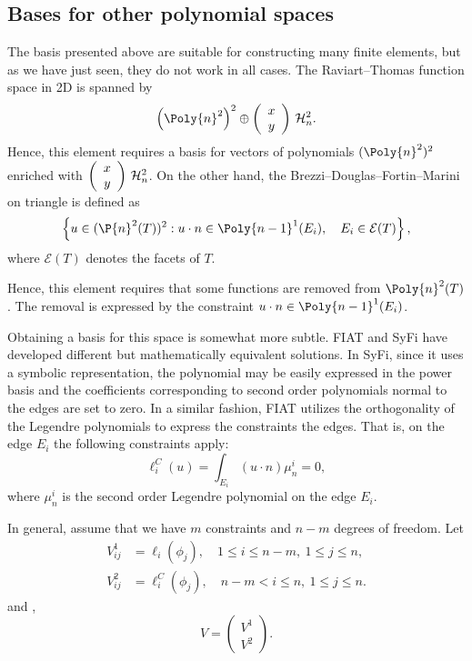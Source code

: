 \subsection{Bases for other polynomial spaces}
The basis presented above are suitable for constructing many finite
elements, but as we have just seen, they do not work in all cases.
The Raviart--Thomas function space in 2D is spanned by
\begin{equation}
\left( \Poly{n}^2 \right)^2 \oplus
\left(\begin{array}{c} x \\y \end{array} \right) \, \H^2_n.
\end{equation}
Hence, this element requires a basis for vectors of polynomials
$(\Poly{n}^2)^2$ enriched with $\left(\begin{array}{c} x \\y \end{array}
\right) \, {\mathcal{H}}^2_n$.  On the other hand, the Brezzi--Douglas--Fortin--Marini
on triangle is defined as
\begin{equation}
\left\{
u \in (\P{n}^2 (T) )^2 : u \cdot n \in \Poly{n-1}^1(E_i), \quad E_i \in \mathcal{E}(T)
\right\},
\end{equation}
where $\mathcal{E}(T)$ denotes the facets of $T$.

Hence, this element requires that some functions are removed from
$\Poly{n}^2 (T)$. The removal is expressed by the constraint $u \cdot n
\in \Poly{n-1}^1(E_i)$.

Obtaining a basis for this space is somewhat more subtle.  FIAT and
SyFi have developed different but mathematically equivalent solutions.
In SyFi, since it uses a symbolic representation, the polynomial may be
easily expressed in the power basis and the coefficients corresponding to
second order polynomials normal to the edges are set to zero. In a similar
fashion, FIAT utilizes the orthogonality of the Legendre polynomials
to express the constraints the edges. That is, on the edge $E_i$
the following constraints apply:
\begin{equation}
\ell^C_i( u ) = \int_{E_i} (u \cdot n) \mu_n^i = 0,
\end{equation}
where $\mu_n^i$ is the second order Legendre polynomial on the edge $E_i$.

In general, assume that we have $m$ constraints and $n-m$ degrees
of freedom.  Let
\begin{align}
V^1_{ij} &= \ell_i( \phi_j ), \quad  1\le i \le n-m, \  1\le j \le n,  \\
V^2_{ij} &= \ell^C_i( \phi_j ), \quad  n-m  < i \le n, \  1\le j \le n.
\end{align}
and
,
\begin{equation}
V = \left( \begin{array}{c} V^1 \\ V^2 \end{array} \right).
\end{equation}

